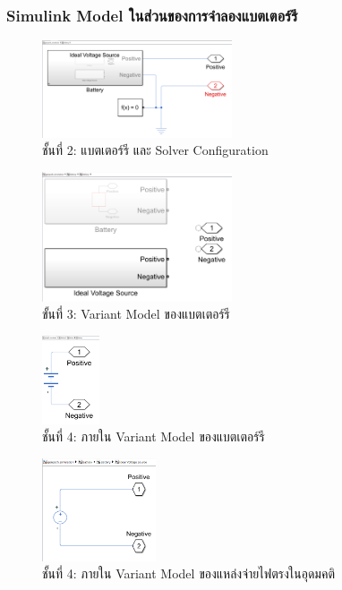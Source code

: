 \documentclass[11pt,a4paper]{article}
\begin{document}
\subsubsection{Simulink Model ในส่วนของการจำลองแบตเตอร์รี}

\begin{figure}[H]
    \centering
    \includegraphics[width=0.5\textwidth]{layer1.png}
    \caption{ชั้นที่ 2: แบตเตอร์รี และ Solver Configuration}
\end{figure}

\begin{figure}[H]
    \centering
    \includegraphics[width=0.5\textwidth]{layer2-1.png}
    \caption{ขั้นที่ 3: Variant Model ของแบตเตอร์รี}
\end{figure}

\begin{figure}[H]
    \centering
    \includegraphics[width=0.15\textwidth]{layer2-1-layer0-1.png}
    \caption{ชั้นที่ 4: ภายใน Variant Model ของแบตเตอร์รี}
\end{figure}

\begin{figure}[H]
    \centering
    \includegraphics[width=0.3\textwidth]{layer2-1-layer0-2.png}
    \caption{ชั้นที่ 4: ภายใน Variant Model ของแหล่งจ่ายไฟตรงในอุดมคติ}
\end{figure}
\end{document}
